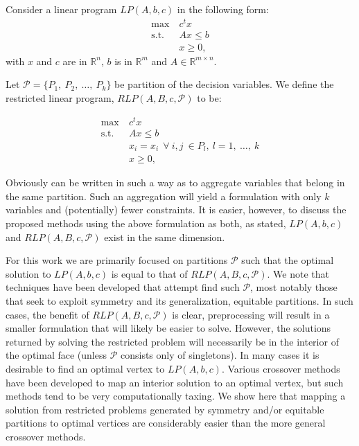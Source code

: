 \documentclass[runningheads]{llncs}
\newcommand{\cP}{{\mathcal P}}
\begin{document}




Consider a linear program $LP(A,b,c)$ in the following form:
\begin{align}
  \max \ & c^t x \\
  \mbox{s.t. } & Ax \leq b\\
  & x \geq 0,
  \end{align}
\noindent with  $x$ and  $c$ are in $\mathbb{R}^n$, $b$ is in $\mathbb{R}^m$ and
$A \in \mathbb{R}^{m \times n}$.

Let $\cP = \{P_1,\ P_2,\ \ldots,\ P_k\}$ be partition of the decision variables. We define the restricted
linear program, $RLP(A,B,c,\cP)$ to be:

\begin{align}
  \max \ & c^t x \\
  \mbox{s.t. } & Ax \leq b\\
  & x_i = x_i \ \ \forall\ i,j \ \in P_l,\  l= 1,\ \ldots,\ k \label{cons:equal}\\
  & x \geq 0,
  \end{align}

\noindent Obviously can be written in such a way as to aggregate variables that
belong in the same partition. Such an aggregation will yield a formulation with
only $k$ variables and (potentially) fewer constraints. It is easier, however, to
discuss the proposed methods using the above formulation as both, as stated,  $LP(A,b,c)$ and
$RLP(A,B,c,\cP)$ exist in the same dimension.

For this work we are primarily focused on partitions $\cP$ such that the optimal
solution to $LP(A,b,c)$ is equal to that of $RLP(A,B,c,\cP)$. We note that
techniques have been developed that attempt find such $\cP$, most notably those
that seek to exploit symmetry and its generalization, equitable partitions. In
such cases, the benefit of  $RLP(A,B,c,\cP)$ is clear, preprocessing will result
in a smaller formulation that will likely be easier to solve. However, the
solutions returned by solving the restricted problem will necessarily be in the
interior of the optimal face (unless $\cP$ consists only of singletons). In many
cases it is desirable to find an optimal vertex to $LP(A,b,c)$. Various
crossover methods have been developed to map an interior solution to an optimal
vertex, but such methods tend to be very computationally taxing. We show here
that mapping a solution from restricted problems generated by symmetry and/or
equitable partitions to optimal vertices are
considerably easier than the more general crossover methods.
\end{document}
